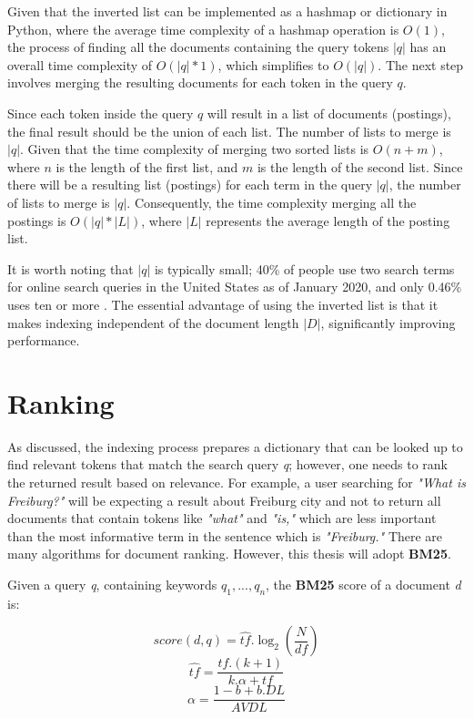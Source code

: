 Given that the inverted list can be implemented as a hashmap or dictionary in Python, where the average time complexity of a hashmap operation is $O(1)$, the process of finding all the documents containing the query tokens $|q|$ has an overall time complexity of $O(|q| * 1)$, which simplifies to $O(|q|)$. The next step involves merging the resulting documents for each token in the query $q$.

Since each token inside the query $q$ will result in a list of documents (postings), the final result should be the union of each list. The number of lists to merge is $|q|$.
Given that the time complexity of merging two sorted lists is $O(n + m)$, where $n$ is the length of the first list, and $m$ is the length of the second list. Since there will be a resulting list (postings) for each term in the query $|q|$, the number of lists to merge is $|q|$. Consequently, the time complexity merging all the postings is $O( |q| * |L|)$, where $|L|$ represents the average length of the posting list.

It is worth noting that $|q|$ is typically small; 40\% of people use two search terms for online search queries in the United States as of January 2020, and only 0.46\% uses ten or more \cite{statista2020}. The essential advantage of using the inverted list is that it makes indexing independent of the document length $|D|$, significantly improving performance.

\section{Ranking}
\label{sec:ranking}
As discussed, the indexing process prepares a dictionary that can be looked up to find relevant tokens that match the search query \textit{q}; however, one needs to rank the returned result based on relevance. For example, a user searching for \textit{"What is Freiburg?"} will be expecting a result about Freiburg city and not to return all documents that contain tokens like \textit{"what"} and \textit{"is,"} which are less important than the most informative term in the sentence which is \textit{"Freiburg."} There are many algorithms for document ranking. However, this thesis will adopt \textbf{BM25}. 

Given a query \textit{q}, containing keywords $q_1, ...,q_n$, the \textbf{BM25} score of a document \textit{d} is:

\begin{equation}
score(d,q) = \hat{tf}.\log_2(\frac{N}{df})
\label{eq:bm25}
\end{equation}
\begin{equation}
\hat{tf} = \frac{tf.(k+1)}{k.\alpha+tf}
\label{eq:tf}
\end{equation}
\begin{equation}
\alpha = \frac{1-b+b.DL}{AVDL}
\label{eq:alpha}
\end{equation}

